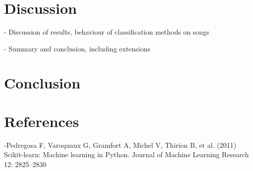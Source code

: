 \documentclass{article}
\begin{document}
\section{Discussion}
- Discussion of results, behaviour of classification methods on songs

- Summary and conclusion, including extensions
\section{Conclusion}

\section{References}
-Pedregosa F, Varoquaux G, Gramfort A, Michel V, Thirion B, et al. (2011) Scikit-learn: Machine
learning in Python. Journal of Machine Learning Research 12: 2825–2830
\end{document}
